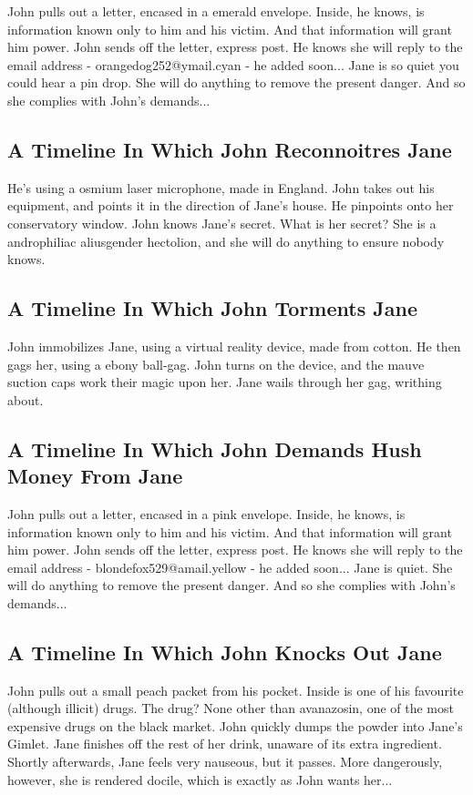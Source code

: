 \documentclass{article}
\begin{document}
John pulls out a letter, encased in a emerald envelope. Inside, he knows, is information known only to him and his victim. And that information will grant him power.
John sends off the letter, express post. He knows she will reply to the email address {-} orangedog252@ymail.cyan {-} he added soon...
Jane is so quiet you could hear a pin drop. She will do anything to remove the present danger. And so she complies with John's demands...
\subsection{A Timeline In Which John Reconnoitres Jane}


He's using a osmium laser microphone, made in England.
John takes out his equipment, and points it in the direction of Jane's house. He pinpoints onto her conservatory window.
John knows Jane's secret. What is her secret? She is a androphiliac aliusgender hectolion, and she will do anything to ensure nobody knows.
\subsection{A Timeline In Which John Torments Jane}


John immobilizes Jane, using a virtual reality device, made from cotton.
He then gags her, using a ebony ball{-}gag.
John turns on the device, and the mauve suction caps work their magic upon her.
Jane wails through her gag, writhing about.
\subsection{A Timeline In Which John Demands Hush Money From Jane}


John pulls out a letter, encased in a pink envelope. Inside, he knows, is information known only to him and his victim. And that information will grant him power.
John sends off the letter, express post. He knows she will reply to the email address {-} blondefox529@amail.yellow {-} he added soon...
Jane is quiet. She will do anything to remove the present danger. And so she complies with John's demands...
\subsection{A Timeline In Which John Knocks Out Jane}


John pulls out a small peach packet from his pocket. Inside is one of his favourite (although illicit) drugs.
The drug? None other than avanazosin, one of the most expensive drugs on the black market.
John quickly dumps the powder into Jane's Gimlet.
Jane finishes off the rest of her drink, unaware of its extra ingredient.
Shortly afterwards, Jane feels very nauseous, but it passes.
More dangerously, however, she is rendered docile, which is exactly as John wants her...
\end{document}
